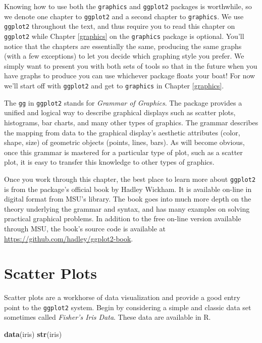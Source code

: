 \documentclass[
]{krantz}
\newenvironment{Shaded}{\begin{snugshade}}{\end{snugshade}}
\newcommand{\KeywordTok}[1]{\textcolor[rgb]{0.13,0.29,0.53}{\textbf{#1}}}
\newcommand{\NormalTok}[1]{#1}
\begin{document}
Knowing how to use both the \texttt{graphics} and \texttt{ggplot2} packages is worthwhile, so we denote one chapter to \texttt{ggplot2} and a second chapter to \texttt{graphics}. We use \texttt{ggplot2} throughout the text, and thus require you to read this chapter on \texttt{ggplot2} while Chapter \ref{graphics} on the \texttt{graphics} package is optional. You'll notice that the chapters are essentially the same, producing the same graphs (with a few exceptions) to let you decide which graphing style you prefer. We simply want to present you with both sets of tools so that in the future when you have graphs to produce you can use whichever package floats your boat! For now we'll start off with \texttt{ggplot2} and get to \texttt{graphics} in Chapter \ref{graphics}.

The \texttt{gg} in \texttt{ggplot2} stands for \emph{Grammar of Graphics}. The package provides a unified and logical way to describe graphical displays such as scatter plots, histograms, bar charts, and many other types of graphics. The grammar describes the mapping from data to the graphical display's aesthetic attributes (color, shape, size) of geometric objects (points, lines, bars). As will become obvious, once this grammar is mastered for a particular type of plot, such as a scatter plot, it is easy to transfer this knowledge to other types of graphics.

Once you work through this chapter, the best place to learn more about \texttt{ggplot2} is from the package's official book \citet{WickhamGgplot2Book} by Hadley Wickham. It is available on-line in digital format from MSU's library. The book goes into much more depth on the theory underlying the grammar and syntax, and has many examples on solving practical graphical problems. In addition to the free on-line version available through MSU, the book's source code is available at \url{https://github.com/hadley/ggplot2-book}.

\hypertarget{scatter-plots}{%
\section{Scatter Plots}\label{scatter-plots}}

Scatter plots are a workhorse of data visualization and provide a good entry point to the \texttt{ggplot2} system. Begin by considering a simple and classic data set sometimes called \emph{Fisher's Iris Data}. These data are available in R.

\begin{Shaded}
\begin{Highlighting}[]
\KeywordTok{data}\NormalTok{(iris)}
\KeywordTok{str}\NormalTok{(iris)}
\end{Highlighting}
\end{Shaded}
\end{document}
